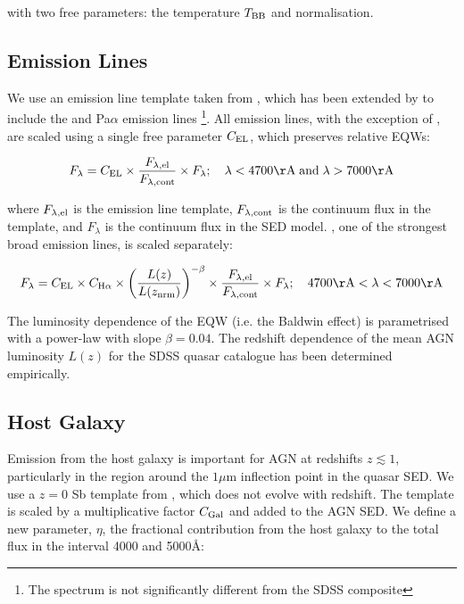 with two free parameters: the temperature $T_{\rm BB}$ and normalisation. 

\subsection{Emission Lines}

We use an emission line template taken from \citet{francis91}, which has been extended by \citet{maddox06} to include the \hans and Pa$\alpha$ emission lines \footnote{The spectrum is not significantly different from the \citet{vandenberk01} SDSS composite}. 
All emission lines, with the exception of \hans, are scaled using a single free parameter $C_{\rm EL}$, which preserves relative \ac{EQW}s:

\begin{eqnarray}
  F_{\lambda} =  C_{\rm EL} \times \frac{F_{\lambda, \rm el}}{F_{\lambda, \rm cont}} \times F_{\lambda} ; \quad \lambda < 4700{\rm \AA} \;{\rm and}\; \lambda > 7000{\rm \AA} 
\end{eqnarray} 

where $F_{\lambda, \rm el}$ is the emission line template, $F_{\lambda,\rm cont}$ is the continuum flux in the template, and $F_{\lambda}$ is the continuum flux in the \ac{SED} model.  
\hans, one of the strongest broad emission lines, is scaled separately: 

\begin{equation}
  F_{\lambda} =  C_{\rm EL} \times C_{{\rm H} \alpha} \times \left( \frac{L(z)} {L(z_{\rm nrm})} \right)^{-\beta} \times \frac{F_{\lambda, \rm el}}{F_{\lambda, \rm cont}} \times F_{\lambda}; \quad 4700{\rm \AA} < \lambda < 7000{\rm \AA} 
\end{equation}

The luminosity dependence of the \ha EQW (i.e. the Baldwin effect) is parametrised with a power-law with slope $\beta=0.04$.
The redshift dependence of the mean \ac{AGN} luminosity $L(z)$ for the SDSS quasar catalogue has been determined empirically.

\subsection{Host Galaxy}

Emission from the host galaxy is important for \ac{AGN} at redshifts $z\lesssim1$, particularly in the region around the $1\mu$m inflection point in the quasar \ac{SED}. 
We use a $z=0$ Sb template from \citet{mannucci01}, which does not evolve with redshift.
The template is scaled by a multiplicative factor $C_{\rm Gal}$ and added to the \ac{AGN} \ac{SED}. 
We define a new parameter, $\eta$, the fractional contribution from the host galaxy to the total flux in the interval 4000 and 5000\AA:


